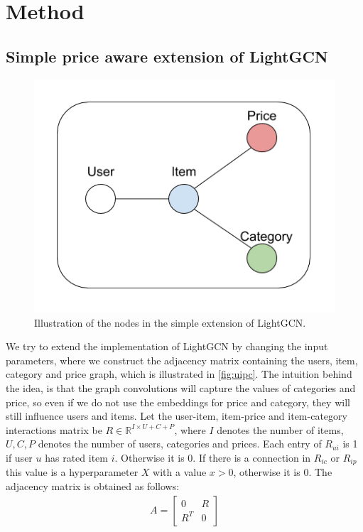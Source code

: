 \section{Method}




\subsection{Simple price aware extension of LightGCN}\label{subsec:simple-extension}
\begin{figure}
    \centering
    \includegraphics[scale=0.5]{figures/uipc.png}
    \caption{Illustration of the nodes in the simple extension of LightGCN.}
    \label{fig:uipc}
\end{figure}
We try to extend the implementation of LightGCN by changing the input parameters, where we construct the adjacency matrix containing the users, item, category and price graph, which is illustrated in \autoref{fig:uipc}.
The intuition behind the idea, is that the graph convolutions will capture the values of categories and price, so even if we do not use the embeddings for price and category, they will still influence users and items.
Let the user-item, item-price and item-category interactions matrix be $R \in \mathbb{R}^{I \times U + C + P}$, where $I$ denotes the number of items, $U, C, P$ denotes the number of users, categories and prices.
Each entry of $R_{ui}$ is 1 if user $u$ has rated item $i$. Otherwise it is 0.
If there is a connection in $R_{ic}$ or $R_{ip}$ this value is a hyperparameter $X$ with a value $x>0$, otherwise it is 0.
The adjacency matrix is obtained as follows:
\begin{gather}
    A =
    \begin{bmatrix}
        0   & R \\
        R^T & 0
    \end{bmatrix}
\end{gather}
